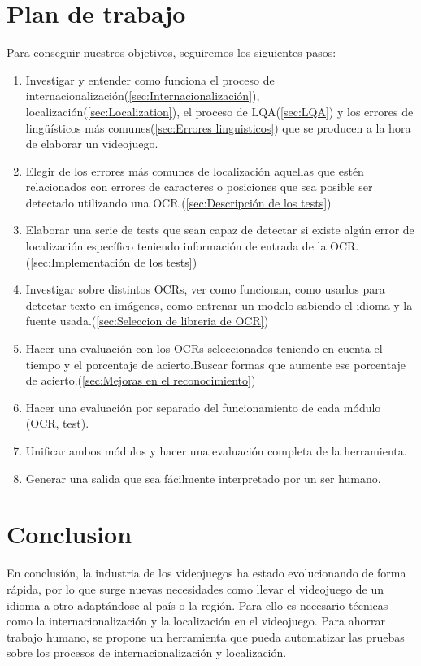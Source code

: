 \section{Plan de trabajo}
Para conseguir nuestros objetivos, seguiremos los siguientes pasos:
\begin{enumerate}
	\item Investigar y entender como funciona el proceso de internacionalización(\ref{sec:Internacionalización}), localización(\ref{sec:Localization}), el proceso de LQA(\ref{sec:LQA}) y los errores de lingüísticos más comunes(\ref{sec:Errores linguisticos}) que se producen a la hora de elaborar un videojuego. 
	\item Elegir de los errores más comunes de localización aquellas que estén relacionados con errores de caracteres o posiciones que sea posible ser detectado utilizando una OCR.(\ref{sec:Descripción de los tests})
	\item Elaborar una serie de tests que sean capaz de detectar si existe algún error de localización específico teniendo información de entrada de la OCR.(\ref{sec:Implementación de los tests})
	\item Investigar sobre distintos OCRs, ver como funcionan, como usarlos para detectar texto en imágenes, como entrenar un modelo sabiendo el idioma y la fuente usada.(\ref{sec:Seleccion de libreria de OCR})
	\item Hacer una evaluación con los OCRs seleccionados teniendo en cuenta el tiempo y el porcentaje de acierto.Buscar formas que aumente ese porcentaje de acierto.(\ref{sec:Mejoras en el reconocimiento})
	\item Hacer una evaluación por separado del funcionamiento de cada módulo (OCR, test).
	\item Unificar ambos módulos y hacer una evaluación completa de la herramienta.
	\item Generar una salida que sea fácilmente interpretado por un ser humano. 
	
\end{enumerate}
\section{Conclusion}
En conclusión, la industria de los videojuegos ha estado evolucionando de forma rápida, por lo que surge nuevas necesidades como llevar el videojuego de un idioma a otro adaptándose al país o la región. Para ello es necesario técnicas como la internacionalización y la localización en el videojuego. Para ahorrar trabajo humano, se propone un herramienta que pueda automatizar las pruebas sobre los procesos de internacionalización y localización.
